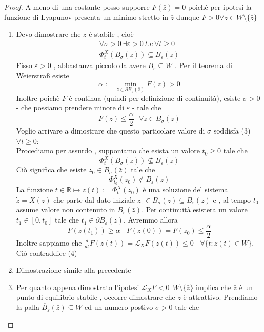 \documentclass{article}
\theoremstyle{definition}
\newcommand{\R}{\mathbb{R}}
\begin{document}
 \begin{proof}
 	A meno di una costante posso supporre $F(\bar{z})=0$ poichè per ipotesi la funzione di Lyapunov presenta un minimo stretto in $\bar{z}$ dunque $F> 0 \forall z \in W \setminus\{\bar{z}\}$ 
 	\begin{enumerate}
 		\item Devo dimostrare che $\bar{z} $ è stabile , cioè 
 		\begin{align}
 		\forall \sigma > 0 \ \exists \varepsilon > 0  \ t.c \ \forall t \geq 0 \\ \Phi^X_t(B_\sigma(\bar{z}))\subseteq B_\varepsilon(\bar{z})
 			\end{align}
 		Fisso $\varepsilon >0$ , abbastanza piccolo da avere $B_\varepsilon \subseteq W$ . Per il teorema di Weierstraß esiste 
 		$$\alpha:= \min_{z \in \partial B_\varepsilon(\bar{z})} F(z) > 0$$ 
 		Inoltre poichè $F$ è continua (quindi per definizione di continuità), esiste $\sigma>0$ - che possiamo prendere minore di $\varepsilon$ - tale che $$F(z) \leq \frac{\alpha}{2} \ \ \ \forall z \in B_\sigma(\bar{z})$$ 
 		Voglio arrivare a dimostrare che questo particolare valore di $\sigma$ soddisfa (3) $\forall t \geq 0$: \\
 		Procediamo per assurdo , supponiamo che esista un valore $t_0 \geq 0$ tale che $$\Phi^X_t(B_\sigma(\bar{z})) \nsubseteq B_\varepsilon (\bar{z})$$ 
 		Ciò significa che esiste $z_0 \in B_\sigma(\bar{z})$ tale che $$\Phi_{t_0}^X(z_0)\notin B_\varepsilon(\bar{z})$$La funzione $t \in \R \mapsto z(t):=\Phi^X_{t}(z_0)$ è una soluzione del sistema $\dot{z}=X(z)$ che parte dal dato iniziale $z_0 \in B_\sigma(\bar{z}) \subseteq B_\varepsilon(\bar{z})$ e , al tempo $t_0$ assume valore non contenuto in $B_\varepsilon(\bar{z})$. Per continuità esistera un valore  $t_1 \in [0,t_0]$ tale che $t_1 \in \partial B_\varepsilon(\bar{z}) $. Avremmo allora 
 		\begin{equation}
 		F(z(t_1)) \geq \alpha \ \ \ \ F(z(0))=F(z_0) \leq \frac{\alpha}{2}
 		\end{equation}
 		Inoltre sappiamo che $\frac{d}{dt}F(z(t))=\mathcal{L}_XF(z(t)) 	\leq  0  \ \ \ \ \forall \{t: z(t) \in W\}$. Ciò contraddice (4)
 		\item Dimostrazione simile alla precedente 
 		\item Per quanto appena dimostrato l'ipotesi $\mathcal{L}_XF < 0 \ \ W \setminus \{\bar{z}\}$ implica che $\bar{z}$ è un punto di equilibrio stabile , occorre dimostrare che $\bar{z} $ è attrattivo. Prendiamo la palla $\overline{B}_\varepsilon (\bar{z})\subseteq W$ ed un numero postivo $\sigma > 0$ tale che 

\end{enumerate}
\end{proof}
\end{document}
